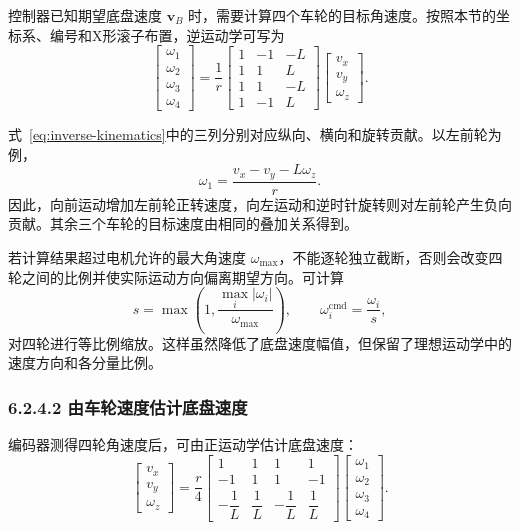 \documentclass[UTF8,zihao=-4]{ctexart}
\newcommand{\vect}[1]{\bm{#1}}
\begin{document}
控制器已知期望底盘速度 $\vect{v}_B$ 时，需要计算四个车轮的目标角速度。按照本节的坐标系、编号和X形滚子布置，逆运动学可写为
\begin{equation}
  \begin{bmatrix}
    \omega_1\\
    \omega_2\\
    \omega_3\\
    \omega_4
  \end{bmatrix}
  =
  \frac{1}{r}
  \begin{bmatrix}
    1 & -1 & -L\\
    1 &  1 &  L\\
    1 &  1 & -L\\
    1 & -1 &  L
  \end{bmatrix}
  \begin{bmatrix}
    v_x\\
    v_y\\
    \omega_z
  \end{bmatrix}.
  \label{eq:inverse-kinematics}
\end{equation}

式~\eqref{eq:inverse-kinematics}中的三列分别对应纵向、横向和旋转贡献。以左前轮为例，
\begin{equation}
  \omega_1=\frac{v_x-v_y-L\omega_z}{r}.
\end{equation}
因此，向前运动增加左前轮正转速度，向左运动和逆时针旋转则对左前轮产生负向贡献。其余三个车轮的目标速度由相同的叠加关系得到。

若计算结果超过电机允许的最大角速度 $\omega_{\max}$，不能逐轮独立截断，否则会改变四轮之间的比例并使实际运动方向偏离期望方向。可计算
\begin{equation}
  s=\max\left(1,\frac{\max_i|\omega_i|}{\omega_{\max}}\right),
  \qquad
  \omega_i^{\mathrm{cmd}}=\frac{\omega_i}{s},
  \label{eq:wheel-normalization}
\end{equation}
对四轮进行等比例缩放。这样虽然降低了底盘速度幅值，但保留了理想运动学中的速度方向和各分量比例。

\subsubsection*{6.2.4.2 由车轮速度估计底盘速度}

编码器测得四轮角速度后，可由正运动学估计底盘速度：
\begin{equation}
  \begin{bmatrix}
    v_x\\
    v_y\\
    \omega_z
  \end{bmatrix}
  =
  \frac{r}{4}
  \begin{bmatrix}
    1 & 1 & 1 & 1\\
   -1 & 1 & 1 &-1\\
   -\dfrac{1}{L} & \dfrac{1}{L} & -\dfrac{1}{L} & \dfrac{1}{L}
  \end{bmatrix}
  \begin{bmatrix}
    \omega_1\\
    \omega_2\\
    \omega_3\\
    \omega_4
  \end{bmatrix}.
  \label{eq:forward-kinematics}
\end{equation}
\end{document}
